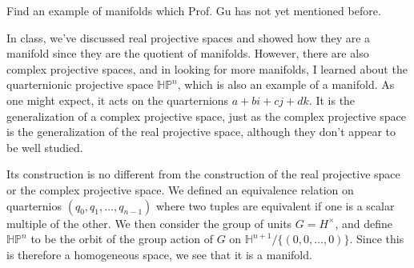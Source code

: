 \documentclass[12pt,letterpaper,boxed]{math_hw_pset}
\begin{document}
\begin{exercise}[Problem 3]
    Find an example of manifolds which Prof. Gu has not yet mentioned before. 
\end{exercise}

\begin{solution}
    In class, we've discussed real projective spaces and showed how they are a manifold since 
    they are the quotient of manifolds. However, there are also complex projective spaces, 
    and in looking for more manifolds, I learned about the quarternionic projective space 
    $\mathbb{HP}^n$, which is also an example of a manifold. As one might expect, it acts on the quarternions 
    $a + bi + cj + dk$. It is the generalization of  
    a complex projective space, just as the complex projective space is the generalization 
    of the real projective space, although they don't appear to be well studied. 

    Its construction is no different from the construction of the real projective space or 
    the complex projective space. We defined an equivalence relation on 
    quarternios $(q_0, q_1, \dots, q_{n-1})$ where two tuples are equivalent if one 
    is a scalar multiple of the other. We then consider the group of units 
    $G = H^{\times}$, and define $\mathbb{HP}^n$
    to be the orbit of the group action of $G$ on $\mathbb{H}^{n+1}/\{(0,0, \dots, 0)\}$. 
    Since this is therefore a homogeneous space, we see that it is a manifold. 

\end{solution}
\end{document}
